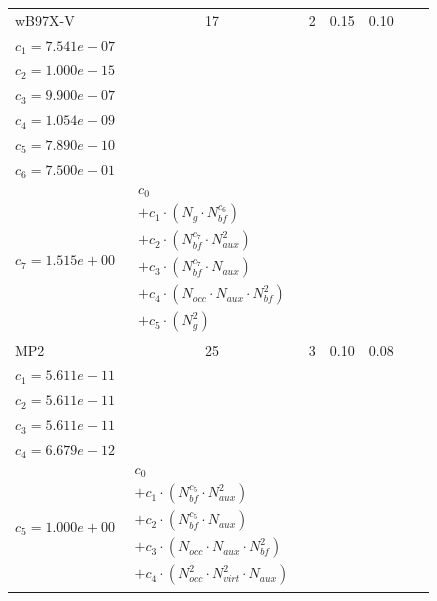 \begin{longtable}{|l|c|c|c|c|p{3.2cm}|p{5.0cm}|}
wB97X-V & 17 & 2 & 0.15 & 0.10 & \begin{tabular}{l}\(c_{0}=3.046e+03\) \\ \(c_{1}=7.541e-07\) \\ \(c_{2}=1.000e-15\) \\ \(c_{3}=9.900e-07\) \\ \(c_{4}=1.054e-09\) \\ \(c_{5}=7.890e-10\) \\ \(c_{6}=7.500e-01\) \\ \(c_{7}=1.515e+00\)\end{tabular} & $\begin{array}{l}c_{0} \\ + c_{1}  \cdot  (N_{g}  \cdot  N_{bf} ^{c_{6}}) \\ + c_{2}  \cdot  (N_{bf} ^{c_{7}}  \cdot  N_{aux}^{2}) \\ + c_{3}  \cdot  (N_{bf} ^{c_{7}}  \cdot  N_{aux}) \\ + c_{4}  \cdot  (N_{occ}  \cdot  N_{aux}  \cdot  N_{bf} ^{2}) \\ + c_{5}  \cdot  (N_{g} ^{2})\end{array}$ \\ 
\hline
MP2 & 25 & 3 & 0.10 & 0.08 & \begin{tabular}{l}\(c_{0}=0.000e+00\) \\ \(c_{1}=5.611e-11\) \\ \(c_{2}=5.611e-11\) \\ \(c_{3}=5.611e-11\) \\ \(c_{4}=6.679e-12\) \\ \(c_{5}=1.000e+00\)\end{tabular} & $\begin{array}{l}c_{0} \\ + c_{1}  \cdot  (N_{bf} ^{c_{5}}  \cdot  N_{aux} ^{2}) \\ + c_{2}  \cdot  (N_{bf} ^{c_{5}}  \cdot  N_{aux}) \\ + c_{3}  \cdot  (N_{occ}  \cdot  N_{aux}  \cdot  N_{bf} ^{2}) \\ + c_{4}  \cdot  (N_{occ} ^{2}  \cdot  N_{virt} ^{2}  \cdot  N_{aux})\end{array}$ \\ 
\hline

\end{longtable}
